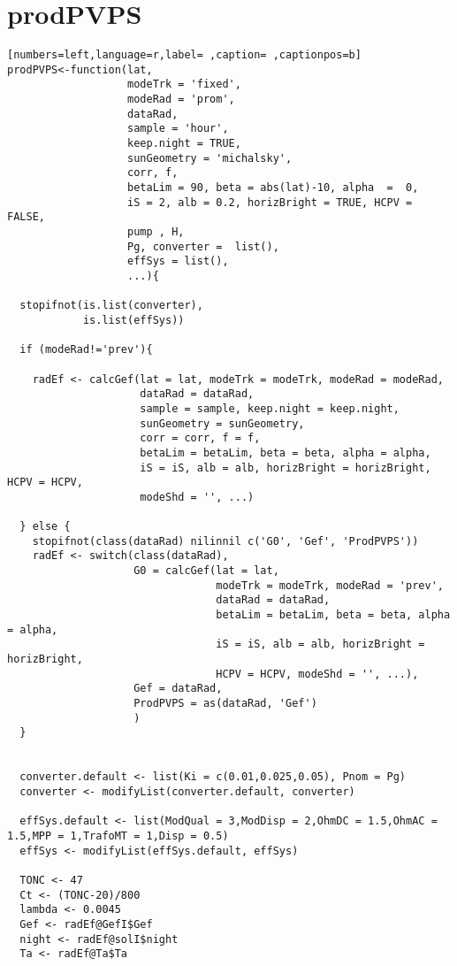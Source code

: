 \section{prodPVPS}
\label{sec:org557f6d8}
\begin{lstlisting}[numbers=left,language=r,label= ,caption= ,captionpos=b]
prodPVPS<-function(lat, 
                   modeTrk = 'fixed', 
                   modeRad = 'prom', 
                   dataRad,
                   sample = 'hour',
                   keep.night = TRUE,
                   sunGeometry = 'michalsky',
                   corr, f,
                   betaLim = 90, beta = abs(lat)-10, alpha  =  0,
                   iS = 2, alb = 0.2, horizBright = TRUE, HCPV = FALSE,
                   pump , H, 
                   Pg, converter =  list(), 
                   effSys = list(),
                   ...){

  stopifnot(is.list(converter),
            is.list(effSys))

  if (modeRad!='prev'){ 

    radEf <- calcGef(lat = lat, modeTrk = modeTrk, modeRad = modeRad,
                     dataRad = dataRad,
                     sample = sample, keep.night = keep.night,
                     sunGeometry = sunGeometry,
                     corr = corr, f = f,
                     betaLim = betaLim, beta = beta, alpha = alpha,
                     iS = iS, alb = alb, horizBright = horizBright, HCPV = HCPV,
                     modeShd = '', ...)

  } else {
    stopifnot(class(dataRad) nilinnil c('G0', 'Gef', 'ProdPVPS'))
    radEf <- switch(class(dataRad),
                    G0 = calcGef(lat = lat, 
                                 modeTrk = modeTrk, modeRad = 'prev',
                                 dataRad = dataRad,
                                 betaLim = betaLim, beta = beta, alpha = alpha,
                                 iS = iS, alb = alb, horizBright = horizBright,
                                 HCPV = HCPV, modeShd = '', ...),
                    Gef = dataRad,
                    ProdPVPS = as(dataRad, 'Gef')
                    )
  }


  converter.default <- list(Ki = c(0.01,0.025,0.05), Pnom = Pg)
  converter <- modifyList(converter.default, converter)

  effSys.default <- list(ModQual = 3,ModDisp = 2,OhmDC = 1.5,OhmAC = 1.5,MPP = 1,TrafoMT = 1,Disp = 0.5)
  effSys <- modifyList(effSys.default, effSys)

  TONC <- 47
  Ct <- (TONC-20)/800
  lambda <- 0.0045
  Gef <- radEf@GefI$Gef
  night <- radEf@solI$night
  Ta <- radEf@Ta$Ta


\end{lstlisting}
